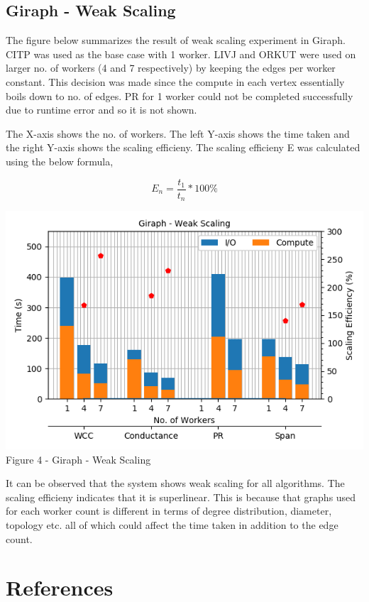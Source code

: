 \documentclass[11pt,a4paper,oneside]{article}
\begin{document}
    \subsection{Giraph - Weak Scaling}
    
    The figure below summarizes the result of weak scaling experiment in Giraph. CITP was used as the base case with 1 worker. LIVJ and ORKUT were used on larger no. of workers (4 and 7 respectively) by keeping the edges per worker constant. This decision was made since the compute in each vertex essentially boils down to no. of edges. PR for 1 worker could not be completed successfully due to runtime error and so it is not shown.
    
    The X-axis shows the no. of workers. The left Y-axis shows the time taken and the right Y-axis shows the scaling efficieny. The scaling efficieny E was calculated using the below formula,
    
    $$E_n = \frac{t_1}{t_n}*100\%$$

    \begin{center}
    	\includegraphics[scale=0.5]{4.png} \\
    	Figure 4 - Giraph - Weak Scaling	
    \end{center}

    It can be observed that the system shows weak scaling for all algorithms. The scaling efficieny indicates that it is superlinear. This is because that graphs used for each worker count is different in terms of degree distribution, diameter, topology etc. all of which could affect the time taken in addition to the edge count.
        
    \section{References}
    \begin{list}{}{}
    	\item
    	\item
    \end{list}  
    
\end{document}
